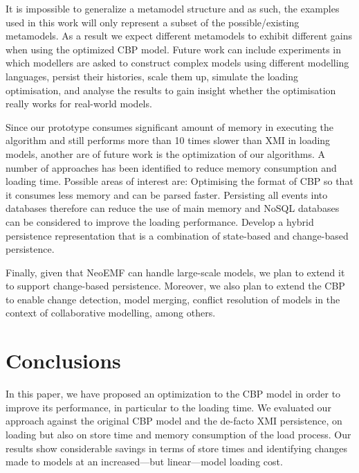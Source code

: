 \documentclass{llncs}
\begin{document}

It is impossible to generalize a metamodel structure and as such, the examples used in this work will only represent a subset of the possible/existing metamodels.
As a result we expect different metamodels to exhibit different gains when using the optimized CBP model. 
Future work can include experiments in which modellers are asked to construct complex models using different modelling languages, persist their histories, scale them up, simulate the loading optimisation, and analyse the results to gain insight whether the optimisation really works for real-world models. 

Since our prototype consumes significant amount of memory in executing the algorithm and still performs more than 10 times slower than XMI in loading models, another are of future work is the optimization of our algorithms.
A number of approaches has been identified to reduce memory consumption and loading time.
Possible areas of interest are:
Optimising the format of CBP so that it consumes less memory and can be parsed faster.
Persisting all events into databases therefore can reduce the use of main memory and NoSQL databases can be considered to improve the loading performance.
Develop a hybrid persistence representation that is a combination of state-based and change-based persistence.

Finally, given that NeoEMF can handle large-scale models, we plan to extend it to support change-based persistence.
Moreover, we also plan to extend the CBP to enable change detection, model merging, conflict resolution of models in the context of collaborative modelling, among others. 

\section{Conclusions}
\label{sec:conclusions}
In this paper, we have proposed an optimization to the CBP model in order to improve its performance, in particular to the loading time.
We evaluated our approach against the original CBP model and the de-facto XMI persistence, on loading but also on store time and memory consumption of the load process. 
Our results show considerable savings in terms of store times and identifying changes made to models at an increased---but linear---model loading cost. 


 

\end{document}
